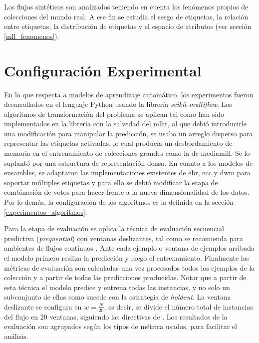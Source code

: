 Los flujos sintéticos son analizados teniendo en cuenta los fenómenos propios de
colecciones del mundo real. A ese fin se estudia el sesgo de etiquetas, la
relación entre etiquetas, la distribución de etiquetas y el espacio de atributos
(ver sección \ref{mll_fenomenos}). 

\section{Configuración Experimental}

En lo que respecta a modelos de aprendizaje automático, los experimentos fueron
desarrollados en el lenguaje Python usando la librería
\textit{scikit-multiflow}. Los algoritmos de transformación del problema se
aplican tal como han sido implementados en la librería con la salvedad del
\acrshort{mlht}, al que debió introducirle una modificación para manipular la
predicción, se usaba un arreglo disperso para representar las etiquetas
activadas, lo cual producía un desbordamiento de memoria en el entrenamiento de
colecciones grandes como la de mediamill. Se lo suplantó por una estructura de
representación densa. En cuanto a los modelos de ensambles, se adaptaron las
implementaciones existentes de \acrshort{ebr}, \acrshort{ecc} y \acrshort{dwm}
para soportar múltiples etiquetas y para ello se debió modificar la etapa de
combinación de votos para hacer frente a la nueva dimensionalidad de los datos.
Por lo demás, la configuración de los algoritmos es la definida en la sección
\ref{experimentos_algoritmos}.

Para la etapa de evaluación se aplica la técnica de evaluación secuencial
predictiva (\textit{prequential}) con ventanas deslizantes, tal como se
recomienda para ambientes de flujos continuos \cite{gama_evaluating_2013}. Ante
cada ejemplo o ventana de ejemplos arribada el modelo primero realiza la
predicción y luego el entrenamiento. Finalmente las métricas de evaluación son
calculadas una vez procesados todos los ejemplos de la colección y a partir de
todas las predicciones producidas.  Notar que a partir de esta técnica el modelo
predice y entrena todas las instancias, y no solo un subconjunto de ellas como
sucede con la estrategia de \textit{holdout}. La ventana deslizante se configura
en $w = \frac{N}{20}$, es decir, se divide el número total de instancias del
flujo en 20 ventanas, siguiendo las directivas de \textcite{read_scalable_2012}.
Los resultados de la evaluación son agrupados según los tipos de métrica usados,
para facilitar el análisis.


